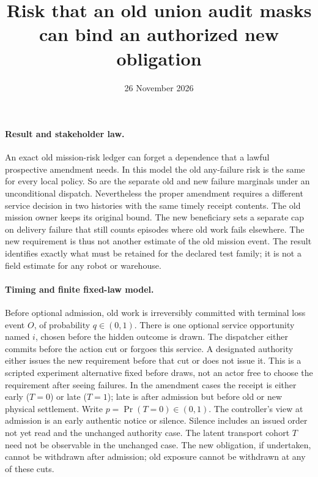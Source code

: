 \documentclass{article}
\title{Risk that an old union audit masks can bind an authorized new obligation}
\date{26 November 2026}
\begin{document}
\maketitle
\paragraph{Result and stakeholder law.}
An exact old mission-risk ledger can forget a dependence that a lawful
prospective amendment needs. In this model the old any-failure risk is
the same for every local policy. So are the separate old and new failure
marginals under an unconditional dispatch. Nevertheless the proper
amendment requires a different service decision in two histories with
the same timely receipt contents. The old mission owner keeps its
original bound. The new beneficiary sets a separate cap on delivery
failure that still counts episodes where old work fails elsewhere. The new
requirement is thus not another estimate of the old mission event.
The result identifies exactly what must be retained for the declared
test family; it is not a field estimate for any robot or warehouse.

\paragraph{Timing and finite fixed-law model.}
Before optional admission, old work is irreversibly committed with
terminal loss event \(O\), of probability \(q\in(0,1)\).
There is one optional service opportunity named \(i\), chosen
before the hidden outcome is drawn. The dispatcher
either commits before the action cut or forgoes this service.
A designated authority either issues the new requirement before that
cut or does not issue it. This is a scripted experiment alternative
fixed before draws, not an actor free to choose the requirement after
seeing failures. In the amendment cases the receipt is either early
(\(T=0\)) or late (\(T=1\)); late is after admission but before
old or new physical settlement. Write \(p=\Pr(T=0)\in(0,1)\).
The controller's view at admission is an early authentic notice or
silence. Silence includes an issued order not yet read and the unchanged
authority case. The latent transport cohort \(T\) need not be
observable in the unchanged case. The new obligation, if undertaken,
cannot be withdrawn after admission; old exposure cannot be withdrawn
at any of these cuts.
\end{document}
